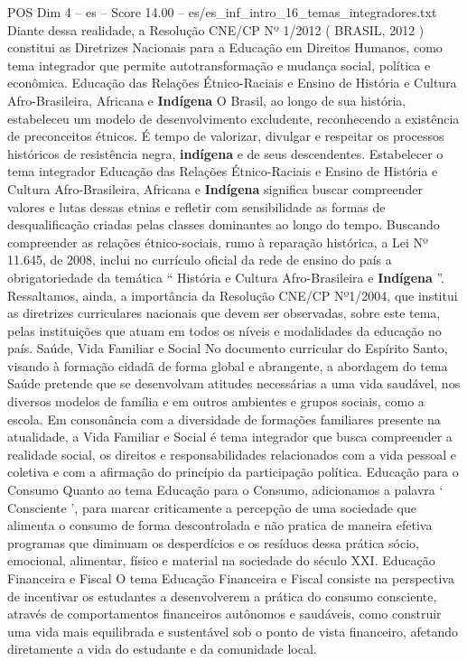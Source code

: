 \begin{textsample}{POS Dim 4 – es – Score 14.00 – es/es\_inf\_intro\_16\_temas\_integradores.txt}
Diante dessa realidade, a Resolução CNE/CP Nº 1/2012 ( BRASIL, 2012 ) constitui as Diretrizes Nacionais para a Educação em Direitos Humanos, como tema integrador que permite autotransformação e mudança social, política e econômica.
Educação das Relações Étnico-Raciais e Ensino de História e Cultura Afro-Brasileira, Africana e \textbf{Indígena} O Brasil, ao longo de sua história, estabeleceu um modelo de desenvolvimento excludente, reconhecendo a existência de preconceitos étnicos.
É tempo de valorizar, divulgar e respeitar os processos históricos de resistência negra, \textbf{indígena} e de seus descendentes.
Estabelecer o tema integrador Educação das Relações Étnico-Raciais e Ensino de História e Cultura Afro-Brasileira, Africana e \textbf{Indígena} significa buscar compreender valores e lutas dessas etnias e refletir com sensibilidade as formas de desqualificação criadas pelas classes dominantes ao longo do tempo.
Buscando compreender as relações étnico-sociais, rumo à reparação histórica, a Lei Nº 11.645, de 2008, inclui no currículo oficial da rede de ensino do país a obrigatoriedade da temática “ História e Cultura Afro-Brasileira e \textbf{Indígena} ”.
Ressaltamos, ainda, a importância da Resolução CNE/CP Nº1/2004, que institui as diretrizes curriculares nacionais que devem ser observadas, sobre este tema, pelas instituições que atuam em todos os níveis e modalidades da educação no país.
Saúde, Vida Familiar e Social No documento curricular do Espírito Santo, visando à formação cidadã de forma global e abrangente, a abordagem do tema Saúde pretende que se desenvolvam atitudes necessárias a uma vida saudável, nos diversos modelos de família e em outros ambientes e grupos sociais, como a escola.
Em consonância com a diversidade de formações familiares presente na atualidade, a Vida Familiar e Social é tema integrador que busca compreender a realidade social, os direitos e responsabilidades relacionados com a vida pessoal e coletiva e com a afirmação do princípio da participação política.
Educação para o Consumo Quanto ao tema Educação para o Consumo, adicionamos a palavra ‘ Consciente ’, para marcar criticamente a percepção de uma sociedade que alimenta o consumo de forma descontrolada e não pratica de maneira efetiva programas que diminuam os desperdícios e os resíduos dessa prática sócio, emocional, alimentar, físico e material na sociedade do século XXI.
Educação Financeira e Fiscal O tema Educação Financeira e Fiscal consiste na perspectiva de incentivar os estudantes a desenvolverem a prática do consumo consciente, através de comportamentos financeiros autônomos e saudáveis, como construir uma vida mais equilibrada e sustentável sob o ponto de vista financeiro, afetando diretamente a vida do estudante e da comunidade local.

\end{textsample}

